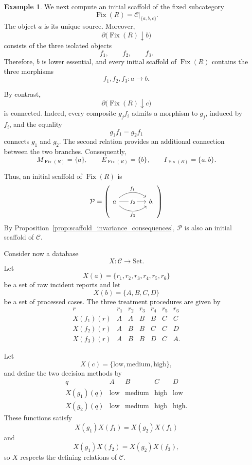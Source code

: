 \documentclass[12pt]{amsart}
\theoremstyle{definition}
\newtheorem{example}[teo]{Example}
\theoremstyle{remark}
\numberwithin{figure}{section}%
\newcommand{\CC}{\mathcal{C}}
\newcommand{\Sets}{\mathrm{Set}}
\begin{document}
\begin{example}
We next compute an initial scaffold of the fixed subcategory
\[
\operatorname{Fix}(R)=\CC|_{\{a,b,c\}}.
\]
The object \(a\) is its unique source. Moreover,
\[
\partial\bigl(\operatorname{Fix}(R)\downarrow b\bigr)
\]
consists of the three isolated objects
\[
f_1,\qquad f_2,\qquad f_3.
\]
Therefore, \(b\) is lower essential, and every initial scaffold of
\(\operatorname{Fix}(R)\) contains the three morphisms
\[
f_1,f_2,f_3\colon a\to b.
\]

By contrast,
\[
\partial\bigl(\operatorname{Fix}(R)\downarrow c\bigr)
\]
is connected. Indeed, every composite \(g_jf_i\) admits a morphism to
\(g_j\), induced by \(f_i\), and the equality
\[
g_1f_1=g_2f_1
\]
connects \(g_1\) and \(g_2\). The second relation provides an additional
connection between the two branches. Consequently,
\[
M_{\operatorname{Fix}(R)}=\{a\},
\qquad
E_{\operatorname{Fix}(R)}=\{b\},
\qquad
I_{\operatorname{Fix}(R)}=\{a,b\}.
\]

Thus, an initial scaffold of \(\operatorname{Fix}(R)\) is
\[
\mathcal P
=
\left(
\begin{tikzcd}[column sep=4em, baseline=-0.5ex]
a
  \arrow[r, "f_1", bend left=40]
  \arrow[r, "f_2" description]
  \arrow[r, "f_3"', bend right=40]
&
b.
\end{tikzcd}
\right)
\]
By Proposition~\ref{prop:scaffold_invariance_consequences},
\(\mathcal P\) is also an initial scaffold of \(\CC\).

Consider now a database
\[
X\colon\CC\longrightarrow\Sets.
\]
Let
\[
X(a)=\{r_1,r_2,r_3,r_4,r_5,r_6\}
\]
be a set of raw incident reports and let
\[
X(b)=\{A,B,C,D\}
\]
be a set of processed cases. The three treatment procedures are given by
\[
\begin{array}{c|cccccc}
r
&
r_1&r_2&r_3&r_4&r_5&r_6
\\
\hline
X(f_1)(r)
&
A&A&B&B&C&C
\\
X(f_2)(r)
&
A&B&B&C&C&D
\\
X(f_3)(r)
&
A&B&B&D&C&A.
\end{array}
\]

Let
\[
X(c)=\{\mathrm{low},\mathrm{medium},\mathrm{high}\},
\]
and define the two decision methods by
\[
\begin{array}{c|cccc}
q&A&B&C&D\\
\hline
X(g_1)(q)
&
\mathrm{low}
&
\mathrm{medium}
&
\mathrm{high}
&
\mathrm{low}
\\
X(g_2)(q)
&
\mathrm{low}
&
\mathrm{medium}
&
\mathrm{high}
&
\mathrm{high}.
\end{array}
\]
These functions satisfy
\[
X(g_1)X(f_1)=X(g_2)X(f_1)
\]
and
\[
X(g_1)X(f_2)=X(g_2)X(f_3),
\]
so \(X\) respects the defining relations of \(\CC\).


\end{example}
\end{document}
